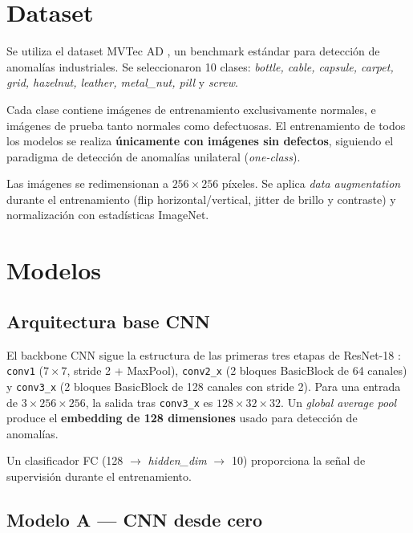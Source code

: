 \documentclass[conference]{IEEEtran}
\begin{document}
\section{Dataset}

Se utiliza el dataset MVTec AD \cite{bergmann2019mvtec}, un benchmark estándar
para detección de anomalías industriales. Se seleccionaron 10 clases:
\textit{bottle, cable, capsule, carpet, grid, hazelnut, leather, metal\_nut,
pill} y \textit{screw}.

Cada clase contiene imágenes de entrenamiento exclusivamente normales, e imágenes
de prueba tanto normales como defectuosas. El entrenamiento de todos los modelos
se realiza \textbf{únicamente con imágenes sin defectos}, siguiendo el paradigma
de detección de anomalías unilateral (\textit{one-class}).

Las imágenes se redimensionan a $256 \times 256$ píxeles. Se aplica
\textit{data augmentation} durante el entrenamiento (flip horizontal/vertical,
jitter de brillo y contraste) y normalización con estadísticas ImageNet.

\section{Modelos}

\subsection{Arquitectura base CNN}

El backbone CNN sigue la estructura de las primeras tres etapas de ResNet-18
\cite{he2016deep}: \texttt{conv1} ($7\times7$, stride 2 + MaxPool),
\texttt{conv2\_x} (2 bloques BasicBlock de 64 canales) y \texttt{conv3\_x}
(2 bloques BasicBlock de 128 canales con stride 2). Para una entrada de
$3\times256\times256$, la salida tras \texttt{conv3\_x} es $128\times32\times32$.
Un \textit{global average pool} produce el \textbf{embedding de 128 dimensiones}
usado para detección de anomalías.

Un clasificador FC (128 $\rightarrow$ \textit{hidden\_dim} $\rightarrow$ 10)
proporciona la señal de supervisión durante el entrenamiento.

\subsection{Modelo A — CNN desde cero}
\end{document}
